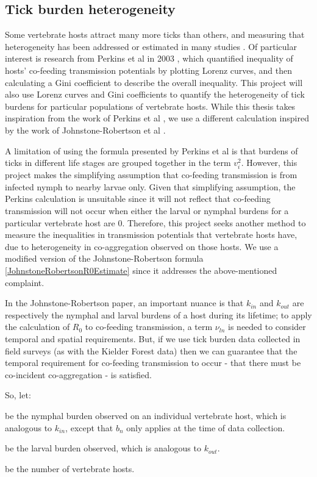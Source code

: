 \documentclass{article}
\begin{document}
\subsection{Tick burden heterogeneity} 

Some vertebrate hosts attract many more ticks than others, and measuring that heterogeneity has been addressed or estimated in many studies \cite{}. Of particular interest is research from Perkins et al in 2003 \cite{Perkins_2003}, which quantified inequality of hosts' co-feeding transmission potentials by plotting Lorenz curves, and then calculating a Gini coefficient to describe the overall inequality. This project will also use Lorenz curves and Gini coefficients to quantify the heterogeneity of tick burdens for particular populations of vertebrate hosts. While this thesis takes inspiration from the work of Perkins et al \cite{Perkins_2003}, we use a different calculation inspired by the work of Johnstone-Robertson et al \cite{JohnstoneRobertson2020}.

A limitation of using the formula presented by Perkins et al is that burdens of ticks in different life stages are grouped together in the term $ v_i^2 $. However, this project makes the simplifying assumption that co-feeding transmission is from infected nymph to nearby larvae only. Given that simplifying assumption, the Perkins calculation is unsuitable since it will not reflect that co-feeding transmission will not occur when either the larval or nymphal burdens for a particular vertebrate host are $ 0 $. Therefore, this project seeks another method to measure the inequalities in transmission potentials that vertebrate hosts have, due to heterogeneity in co-aggregation observed on those hosts. We use a modified version of the Johnstone-Robertson formula \eqref{JohnstoneRobertsonR0Estimate} since it addresses the above-mentioned complaint.

In the Johnstone-Robertson paper, an important nuance is that $ k_{in} $ and $ k_{out} $ are respectively the nymphal and larval burdens of a host during its lifetime; to apply the calculation of $ R_0 $ to co-feeding transmission, a term $ \nu_{ln} $ is needed to consider temporal and spatial requirements. But, if we use tick burden data collected in field surveys (as with the Kielder Forest data) then we can guarantee that the temporal requirement for co-feeding transmission to occur - that there must be co-incident co-aggregation - is satisfied.

So, let:

\begin{description}[leftmargin=1cm, style=nextline]
	\item[$ b_n $] be the nymphal burden observed on an individual vertebrate host, which is analogous to $ k_{in} $, except that $ b_n $ only applies at the time of data collection.
	\item[$ b_l $] be the larval burden observed, which is analogous to $ k_{out} $.
	\item[$ m $] be the number of vertebrate hosts.
\end{description}
\end{document}
